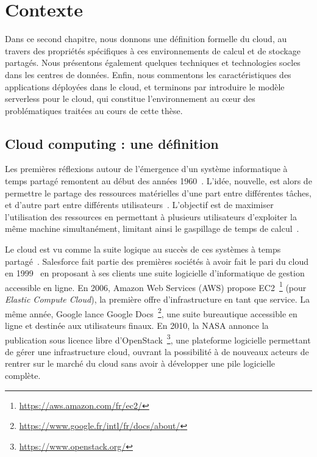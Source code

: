 \clearemptydoublepage
\chapter{Contexte}
\label{chapter:context}

Dans ce second chapitre, nous donnons une définition formelle du cloud, au travers des propriétés spécifiques à ces environnements de calcul et de stockage partagés. Nous présentons également quelques techniques et technologies socles dans les centres de données. Enfin, nous commentons les caractéristiques des applications déployées dans le cloud, et terminons par introduire le modèle serverless pour le cloud, qui constitue l'environnement au cœur des problématiques traitées au cours de cette thèse.

\section{Cloud computing : une définition}

Les premières réflexions autour de l'émergence d'un système informatique à temps partagé remontent au début des années 1960~\cite{greenberger1962management}. L'idée, nouvelle, est alors de permettre le partage des ressources matérielles d'une part entre différentes tâches, et d'autre part entre différents utilisateurs~\cite{meyerVirtualMachineTimesharing1970}. L'objectif est de maximiser l'utilisation des ressources en permettant à plusieurs utilisateurs d'exploiter la même machine simultanément, limitant ainsi le gaspillage de temps de calcul~\cite{corbato1962experimental}.

Le cloud est vu comme la suite logique au succès de ces systèmes à temps partagé~\cite{hayesCloudComputing2008}. Salesforce fait partie des premières sociétés à avoir fait le pari du cloud en 1999~\cite{weissmanDesignForceCom2009} en proposant à ses clients une suite logicielle d'informatique de gestion accessible en ligne. En 2006, Amazon Web Services (\gls{AWS}) propose EC2~\footnote{\href{https://aws.amazon.com/fr/ec2/}{https://aws.amazon.com/fr/ec2/}} (pour \textit{Elastic Compute Cloud}), la première offre d'infrastructure en tant que service. La même année, Google lance Google Docs~\footnote{\href{https://www.google.fr/intl/fr/docs/about/}{https://www.google.fr/intl/fr/docs/about/}}, une suite bureautique accessible en ligne et destinée aux utilisateurs finaux. En 2010, la NASA annonce la publication sous licence libre d'OpenStack~\footnote{\href{https://www.openstack.org/}{https://www.openstack.org/}}, une plateforme logicielle permettant de gérer une infrastructure cloud, ouvrant la possibilité à de nouveaux acteurs de rentrer sur le marché du cloud sans avoir à développer une pile logicielle complète.

